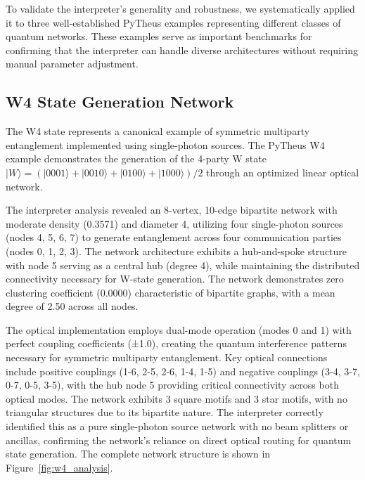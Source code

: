 \documentclass[11pt,a4paper]{article}
\begin{document}
To validate the interpreter's generality and robustness, we systematically applied it to three well-established PyTheus examples representing different classes of quantum networks. These examples serve as important benchmarks for confirming that the interpreter can handle diverse architectures without requiring manual parameter adjustment.

\subsection{W4 State Generation Network}

The W4 state represents a canonical example of symmetric multiparty entanglement implemented using single-photon sources. The PyTheus W4 example demonstrates the generation of the 4-party W state $|W\rangle = (|0001\rangle + |0010\rangle + |0100\rangle + |1000\rangle)/2$ through an optimized linear optical network.

The interpreter analysis revealed an 8-vertex, 10-edge bipartite network with moderate density (0.3571) and diameter 4, utilizing four single-photon sources (nodes 4, 5, 6, 7) to generate entanglement across four communication parties (nodes 0, 1, 2, 3). The network architecture exhibits a hub-and-spoke structure with node 5 serving as a central hub (degree 4), while maintaining the distributed connectivity necessary for W-state generation. The network demonstrates zero clustering coefficient (0.0000) characteristic of bipartite graphs, with a mean degree of 2.50 across all nodes.

The optical implementation employs dual-mode operation (modes 0 and 1) with perfect coupling coefficients (±1.0), creating the quantum interference patterns necessary for symmetric multiparty entanglement. Key optical connections include positive couplings (1-6, 2-5, 2-6, 1-4, 1-5) and negative couplings (3-4, 3-7, 0-7, 0-5, 3-5), with the hub node 5 providing critical connectivity across both optical modes. The network exhibits 3 square motifs and 3 star motifs, with no triangular structures due to its bipartite nature. The interpreter correctly identified this as a pure single-photon source network with no beam splitters or ancillas, confirming the network's reliance on direct optical routing for quantum state generation. The complete network structure is shown in Figure~\ref{fig:w4_analysis}.
\end{document}
